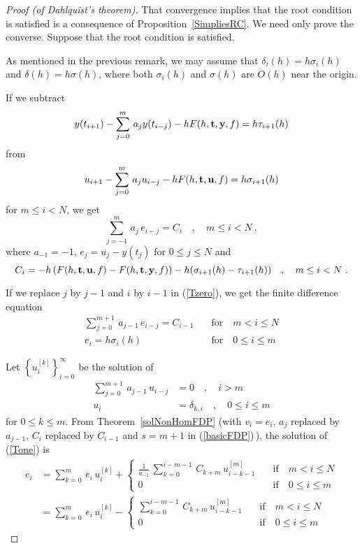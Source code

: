 \begin{proof}[Proof (of Dahlquist's theorem)]
That convergence implies that the root condition is satisfied is a
consequence of Proposition~\ref{SimpliesRC}.  We need only prove the
converse.  Suppose that the root condition is satisfied.

As mentioned in the previous remark, we may assume that
$\delta_i(h) = h \sigma_i(h)$ and $\delta(h) = h \sigma(h)$, where
both $\sigma_i(h)$ and $\sigma(h)$ are $O(h)$ near the origin.

If we subtract
\[
y(t_{i+1}) - \sum_{j=0}^m\,a_jy(t_{i-j})
- h F(h,\mathbf{t},\mathbf{y},f) = h \tau_{i+1}(h)
\]
from
\[
u_{i+1} - \sum_{j=0}^m\,a_j u_{i-j} - h F(h,\mathbf{t},\mathbf{u},f)
= h \sigma_{i+1}(h)
\]
for $m \leq i < N$, we get
\begin{equation} \label{Tzero}
\sum_{j=-1}^m\,a_j\,e_{i-j} = C_i \quad , \quad  m \leq i < N \ ,
\end{equation}
where $a_{-1} = -1$, $e_j = u_j - y(t_j)$ for $0 \leq j \leq N$ and
\[
C_i = -h \left( F(h,\mathbf{t},\mathbf{u},f) -
F(h,\mathbf{t},\mathbf{y},f) \right) - h ( \sigma_{i+1}(h) - \tau_{i+1}(h) )
\quad , \quad m \leq i < N \ .
\]

If we replace $j$ by $j-1$ and $i$ by $i-1$ in (\ref{Tzero}), we get
the finite difference equation
\begin{equation} \label{Tone}
\begin{split}
\sum_{j=0}^{m+1}\,a_{j-1}\,e_{i-j} = C_{i-1} &\quad \text{for} \quad
m < i \leq N \\
e_i = h\sigma_i(h) & \quad \text{for} \quad 0 \leq i \leq m
\end{split}
\end{equation}

Let $\displaystyle \left\{ u_i^{[k]} \right\}_{i=0}^\infty$ be the solution of
\begin{align*}
\sum_{j=0}^{m+1}\,a_{j-1}\,u_{i-j} &= 0 \quad , \quad i > m \\
u_i &= \delta_{k,i} \quad , \quad 0 \leq i \leq m
\end{align*}
for $0 \leq k \leq m$.
From Theorem~\ref{solNonHomFDP} (with $v_i= e_i$, $a_j$ replaced by
$a_{j-1}$, $C_i$ replaced by $C_{i-1}$ and $s=m+1$ in
(\ref{basicFDP})\,), the solution of (\ref{Tone}) is
\begin{align}
e_i &= \sum_{k=0}^m\,e_i\,u_i^{[k]}
+ \begin{cases}
\displaystyle \frac{1}{a_{-1}}\,
\sum_{k=0}^{i-m-1}\,C_{k+m}\,u_{i-k-1}^{[m]} & \quad \text{if} \quad
m<i \leq N \\
0  & \quad \text{if} \quad 0\leq i \leq m 
\end{cases} \nonumber  \\
&= \sum_{k=0}^m\,e_i\,u_i^{[k]}
- \begin{cases}
\displaystyle
\sum_{k=0}^{i-m-1}\,C_{k+m}\,u_{i-k-1}^{[m]} & \quad \text{if} \quad
m<i \leq N \\
0  & \quad \text{if} \quad 0\leq i \leq m 
\end{cases} \label{Ttwo}
\end{align}


\end{proof}
